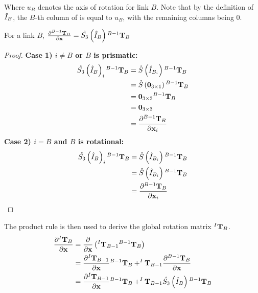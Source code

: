 \noindent Where $u_B$ denotes the axis of rotation for link $B$. Note that by the definition of $\hat{I}_B$, the $B$-th column of is equal to $u_B$, with the remaining columns being 0. 
\begin{lemma} \label{lem:d_s_rot}
For a link $B$, $\frac{\partial {^{B-1}\mathbf{T}_B}}{\partial {\mathbf{{x}}}} = \mathring{S_3}\left(\hat{I}_B\right){^{B-1}\mathbf{T}_{B}}$
\begin{proof}
\noindent \textbf{Case 1) $i \ne B$ or $B$ is prismatic:}
\begin{align*}
    \mathring{S_3}\left(\hat{I}_B\right)_i{^{B-1}\mathbf{T}_{B}} &= \mathring{S}\left({\hat{I}_{B_i}}\right){^{B-1}\mathbf{T}_{B}} \\
    &= \mathring{S}\left({\mathbf{0}}_{3 \times 1}\right){^{B-1}\mathbf{T}_{B}} \\
    &= {{\mathbf{0}}_{3 \times 3}}{^{B-1}\mathbf{T}_{B}} \\
    &= {{\mathbf{0}}_{3 \times 3}}\\
    &= \frac{\partial {^{B-1}\mathbf{T}_B}}{\partial {\mathbf{{x}}}_i}
\end{align*}
\noindent \textbf{Case 2) $i = B$ and $B$ is rotational:} 
\begin{align*}
    \mathring{S_3}\left(\hat{I}_B\right)_i{^{B-1}\mathbf{T}_{B}} &= \mathring{S}\left({\hat{I}_{B_i}}\right){^{B-1}\mathbf{T}_{B}} \\
    &= \mathring{S}\left({\hat{I}_{B_i}}\right){^{B-1}\mathbf{T}_{B}} \\
    &= \frac{\partial {^{B-1}\mathbf{T}_B}}{\partial {\mathbf{{x}}}_i}
\end{align*}
\end{proof}
\end{lemma}
\noindent The product rule is then used to derive the global rotation matrix ${^I\mathbf{T}_B}$.
\begin{align}\nonumber
\frac{\partial{^I\mathbf{T}_B}}{\partial{\mathbf{{x}}}} &= \frac{\partial}{\partial{\mathbf{{x}}}}\left (^I\mathbf{T}_{B-1}{^{B-1}\mathbf{T}}_B \right ) \\ \nonumber
                    &= \frac{\partial^I\mathbf{T}_{B-1}}{\partial{\mathbf{{x}}}} {^{B-1}\mathbf{T}}_B + ^I\mathbf{T}_{B-1}\frac{\partial{^{B-1}\mathbf{T}}_B}{\partial{\mathbf{{x}}}} \\ \label{eqn:d_itb}
                    &= \frac{\partial^I\mathbf{T}_{B-1}}{\partial{\mathbf{{x}}}} {^{B-1}\mathbf{T}}_B + ^I\mathbf{T}_{B-1}\mathring{S_3}\left(\hat{I}_B\right){^{B-1}\mathbf{T}_{B}}
\end{align}


